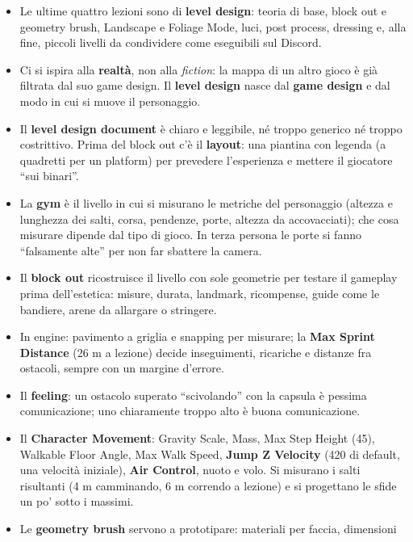 \begin{itemize}
  \item Le ultime quattro lezioni sono di \textbf{level design}: teoria di base, block out e
        geometry brush, Landscape e Foliage Mode, luci, post process, dressing e, alla fine,
        piccoli livelli da condividere come eseguibili sul Discord.
  \item Ci si ispira alla \textbf{realtà}, non alla \emph{fiction}: la mappa di un altro
        gioco è già filtrata dal suo game design. Il \textbf{level design} nasce dal
        \textbf{game design} e dal modo in cui si muove il personaggio.
  \item Il \textbf{level design document} è chiaro e leggibile, né troppo generico né
        troppo costrittivo. Prima del block out c'è il \textbf{layout}: una piantina con
        legenda (a quadretti per un platform) per prevedere l'esperienza e mettere il
        giocatore ``sui binari''.
  \item La \textbf{gym} è il livello in cui si misurano le metriche del personaggio
        (altezza e lunghezza dei salti, corsa, pendenze, porte, altezza da accovacciati);
        che cosa misurare dipende dal tipo di gioco. In terza persona le porte si fanno
        ``falsamente alte'' per non far sbattere la camera.
  \item Il \textbf{block out} ricostruisce il livello con sole geometrie per testare il
        gameplay prima dell'estetica: misure, durata, landmark, ricompense, guide come le
        bandiere, arene da allargare o stringere.
  \item In engine: pavimento a griglia e snapping per misurare; la \textbf{Max Sprint
        Distance} (26 m a lezione) decide inseguimenti, ricariche e distanze fra
        ostacoli, sempre con un margine d'errore.
  \item Il \textbf{feeling}: un ostacolo superato ``scivolando'' con la capsula è pessima
        comunicazione; uno chiaramente troppo alto è buona comunicazione.
  \item Il \textbf{Character Movement}: Gravity Scale, Mass, Max Step Height (45),
        Walkable Floor Angle, Max Walk Speed, \textbf{Jump Z Velocity} (420 di default,
        una velocità iniziale), \textbf{Air Control}, nuoto e volo. Si misurano i salti
        risultanti (4 m camminando, 6 m correndo a lezione) e si progettano le sfide un po'
        sotto i massimi.
  \item Le \textbf{geometry brush} servono a prototipare: materiali per faccia, dimensioni

\end{itemize}
